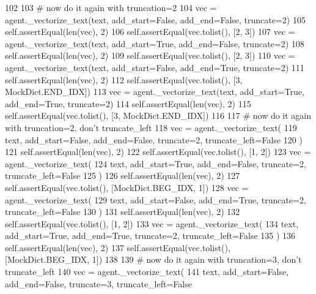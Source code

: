 \begin{DoxyCode}
102 
103         \textcolor{comment}{# now do it again with truncation=2}
104         vec = agent.\_vectorize\_text(text, add\_start=\textcolor{keyword}{False}, add\_end=\textcolor{keyword}{False}, truncate=2)
105         self.assertEqual(len(vec), 2)
106         self.assertEqual(vec.tolist(), [2, 3])
107         vec = agent.\_vectorize\_text(text, add\_start=\textcolor{keyword}{True}, add\_end=\textcolor{keyword}{False}, truncate=2)
108         self.assertEqual(len(vec), 2)
109         self.assertEqual(vec.tolist(), [2, 3])
110         vec = agent.\_vectorize\_text(text, add\_start=\textcolor{keyword}{False}, add\_end=\textcolor{keyword}{True}, truncate=2)
111         self.assertEqual(len(vec), 2)
112         self.assertEqual(vec.tolist(), [3, MockDict.END\_IDX])
113         vec = agent.\_vectorize\_text(text, add\_start=\textcolor{keyword}{True}, add\_end=\textcolor{keyword}{True}, truncate=2)
114         self.assertEqual(len(vec), 2)
115         self.assertEqual(vec.tolist(), [3, MockDict.END\_IDX])
116 
117         \textcolor{comment}{# now do it again with truncation=2, don't truncate\_left}
118         vec = agent.\_vectorize\_text(
119             text, add\_start=\textcolor{keyword}{False}, add\_end=\textcolor{keyword}{False}, truncate=2, truncate\_left=\textcolor{keyword}{False}
120         )
121         self.assertEqual(len(vec), 2)
122         self.assertEqual(vec.tolist(), [1, 2])
123         vec = agent.\_vectorize\_text(
124             text, add\_start=\textcolor{keyword}{True}, add\_end=\textcolor{keyword}{False}, truncate=2, truncate\_left=\textcolor{keyword}{False}
125         )
126         self.assertEqual(len(vec), 2)
127         self.assertEqual(vec.tolist(), [MockDict.BEG\_IDX, 1])
128         vec = agent.\_vectorize\_text(
129             text, add\_start=\textcolor{keyword}{False}, add\_end=\textcolor{keyword}{True}, truncate=2, truncate\_left=\textcolor{keyword}{False}
130         )
131         self.assertEqual(len(vec), 2)
132         self.assertEqual(vec.tolist(), [1, 2])
133         vec = agent.\_vectorize\_text(
134             text, add\_start=\textcolor{keyword}{True}, add\_end=\textcolor{keyword}{True}, truncate=2, truncate\_left=\textcolor{keyword}{False}
135         )
136         self.assertEqual(len(vec), 2)
137         self.assertEqual(vec.tolist(), [MockDict.BEG\_IDX, 1])
138 
139         \textcolor{comment}{# now do it again with truncation=3, don't truncate\_left}
140         vec = agent.\_vectorize\_text(
141             text, add\_start=\textcolor{keyword}{False}, add\_end=\textcolor{keyword}{False}, truncate=3, truncate\_left=\textcolor{keyword}{False}

\end{DoxyCode}
